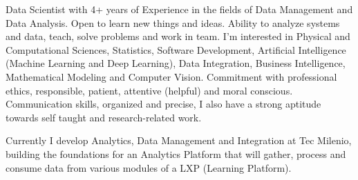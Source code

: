 %
%
%
\par{
Data Scientist with 4+ years of Experience in the fields of Data Management and Data Analysis. Open to learn new things and ideas. Ability to analyze systems and data, teach, solve problems and work in team. I’m interested in Physical and Computational Sciences, Statistics, Software Development, Artificial Intelligence (Machine Learning and Deep Learning), Data Integration, Business Intelligence, Mathematical Modeling and Computer Vision. Commitment with professional ethics, responsible, patient, attentive (helpful) and moral conscious. Communication skills, organized and precise, I also have a strong aptitude towards self taught and research-related work.

Currently I develop Analytics, Data Management and Integration at Tec Milenio, building the foundations for an Analytics Platform that will gather, process and consume data from various modules of a LXP (Learning Platform).
}